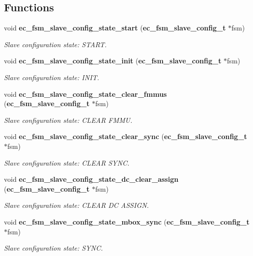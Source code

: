 \subsection*{Functions}
\begin{DoxyCompactItemize}
\item 
void {\bf ec\-\_\-fsm\-\_\-slave\-\_\-config\-\_\-state\-\_\-start} ({\bf ec\-\_\-fsm\-\_\-slave\-\_\-config\-\_\-t} $\ast$fsm)
\begin{DoxyCompactList}\small\item\em Slave configuration state\-: S\-T\-A\-R\-T. \end{DoxyCompactList}\item 
void {\bf ec\-\_\-fsm\-\_\-slave\-\_\-config\-\_\-state\-\_\-init} ({\bf ec\-\_\-fsm\-\_\-slave\-\_\-config\-\_\-t} $\ast$fsm)
\begin{DoxyCompactList}\small\item\em Slave configuration state\-: I\-N\-I\-T. \end{DoxyCompactList}\item 
void {\bf ec\-\_\-fsm\-\_\-slave\-\_\-config\-\_\-state\-\_\-clear\-\_\-fmmus} ({\bf ec\-\_\-fsm\-\_\-slave\-\_\-config\-\_\-t} $\ast$fsm)
\begin{DoxyCompactList}\small\item\em Slave configuration state\-: C\-L\-E\-A\-R F\-M\-M\-U. \end{DoxyCompactList}\item 
void {\bf ec\-\_\-fsm\-\_\-slave\-\_\-config\-\_\-state\-\_\-clear\-\_\-sync} ({\bf ec\-\_\-fsm\-\_\-slave\-\_\-config\-\_\-t} $\ast$fsm)
\begin{DoxyCompactList}\small\item\em Slave configuration state\-: C\-L\-E\-A\-R S\-Y\-N\-C. \end{DoxyCompactList}\item 
void {\bf ec\-\_\-fsm\-\_\-slave\-\_\-config\-\_\-state\-\_\-dc\-\_\-clear\-\_\-assign} ({\bf ec\-\_\-fsm\-\_\-slave\-\_\-config\-\_\-t} $\ast$fsm)
\begin{DoxyCompactList}\small\item\em Slave configuration state\-: C\-L\-E\-A\-R D\-C A\-S\-S\-I\-G\-N. \end{DoxyCompactList}\item 
void {\bf ec\-\_\-fsm\-\_\-slave\-\_\-config\-\_\-state\-\_\-mbox\-\_\-sync} ({\bf ec\-\_\-fsm\-\_\-slave\-\_\-config\-\_\-t} $\ast$fsm)
\begin{DoxyCompactList}\small\item\em Slave configuration state\-: S\-Y\-N\-C. \end{DoxyCompactList}\item 

\end{DoxyCompactItemize}
